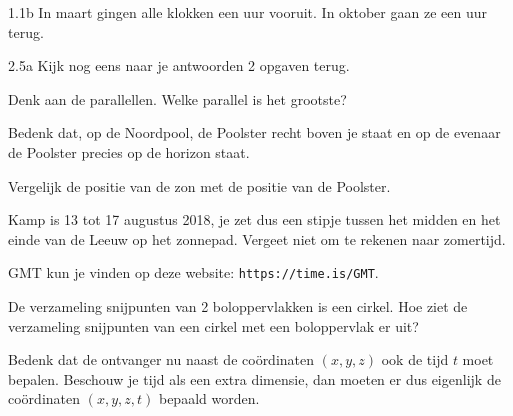 \begin{Hint}{1.1b}
            In maart gingen alle klokken een uur vooruit. In oktober gaan ze een uur terug.
        
\end{Hint}
\begin{Hint}{2.5a}
			Kijk nog eens naar je antwoorden 2 opgaven terug.
		
\end{Hint}
\begin{Hint}{2.14}
		Denk aan de parallellen. Welke parallel is het grootste?
	
\end{Hint}
\begin{Hint}{3.2}
 Bedenk dat, op de Noordpool, de Poolster recht boven je staat en op de evenaar de Poolster precies op de horizon staat.
\end{Hint}
\begin{Hint}{3.5}
  Vergelijk de positie van de zon met de positie van de Poolster.
 
\end{Hint}
\begin{Hint}{3.8}
  Kamp is 13 tot 17 augustus 2018, je zet dus een stipje tussen het midden en het einde van de Leeuw op het zonnepad. Vergeet niet om te rekenen naar zomertijd.
 
\end{Hint}
\begin{Hint}{3.18}
  GMT kun je vinden op deze website: \texttt{https://time.is/GMT}.
 
\end{Hint}
\begin{Hint}{4.9}
		De verzameling snijpunten van 2 boloppervlakken is een cirkel. Hoe ziet de verzameling snijpunten van een cirkel met een boloppervlak er uit?
	
\end{Hint}
\begin{Hint}{4.15}
		Bedenk dat de ontvanger nu naast de co\"ordinaten $(x, y, z)$ ook de tijd $t$ moet bepalen. Beschouw je tijd als een extra dimensie, dan moeten er dus eigenlijk de co\"ordinaten $(x, y, z, t)$ bepaald worden.
	
\end{Hint}
